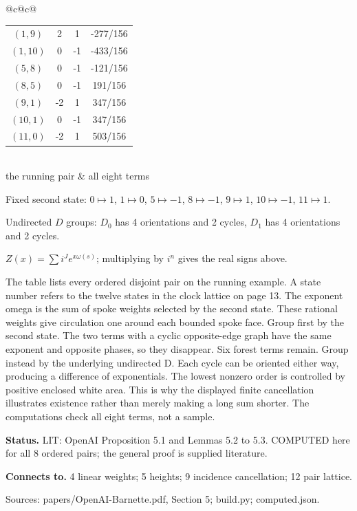 \documentclass[10pt,a4paper]{amsart}
\begin{document}
\begin{center}
\begin{minipage}{.86\textwidth}
\begin{tabular}{@{}c@{\hspace{7mm}}c@{}}
\begin{tabular}{cccc}
$(1,9)$ & 2 & 1 & -277/156\\
$(1,10)$ & 0 & -1 & -433/156\\
$(5,8)$ & 0 & -1 & -121/156\\
$(8,5)$ & 0 & -1 & 191/156\\
$(9,1)$ & -2 & 1 & 347/156\\
$(10,1)$ & 0 & -1 & 347/156\\
$(11,0)$ & -2 & 1 & 503/156\\
\hline\end{tabular}\\[0.5mm]
\footnotesize the running pair & \footnotesize all eight terms
\end{tabular}\par\medskip Fixed second state: $0\mapsto 1$, $1\mapsto 0$, $5\mapsto -1$, $8\mapsto -1$, $9\mapsto 1$, $10\mapsto -1$, $11\mapsto 1$.\par Undirected $D$ groups: $D_0$ has 4 orientations and 2 cycles, $D_1$ has 4 orientations and 2 cycles.\par $Z(x)=\sum i^J e^{x\omega(s)}$; multiplying by $i^n$ gives the real signs above.
\end{minipage}\end{center}
The table lists every ordered disjoint pair on the running example. A state number refers to the twelve states in the clock lattice on page 13. The exponent omega is the sum of spoke weights selected by the second state. These rational weights give circulation one around each bounded spoke face. Group first by the second state. The two terms with a cyclic opposite-edge graph have the same exponent and opposite phases, so they disappear. Six forest terms remain. Group instead by the underlying undirected D. Each cycle can be oriented either way, producing a difference of exponentials. The lowest nonzero order is controlled by positive enclosed white area. This is why the displayed finite cancellation illustrates existence rather than merely making a long sum shorter. The computations check all eight terms, not a sample.

\textbf{Status.} LIT: OpenAI Proposition 5.1 and Lemmas 5.2 to 5.3. COMPUTED here for all 8 ordered pairs; the general proof is supplied literature.

\textbf{Connects to.} 4 linear weights; 5 heights; 9 incidence cancellation; 12 pair lattice.

{\footnotesize\raggedright Sources: papers/\allowbreak{}OpenAI-Barnette.pdf, Section 5;\allowbreak{} build.py;\allowbreak{} computed.json.\par}
\end{document}
